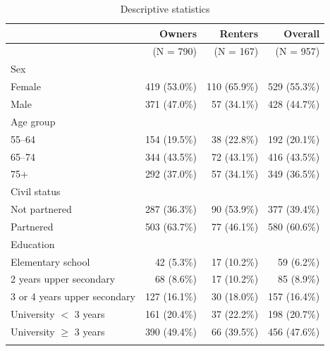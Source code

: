 \begin{table}[H]
\centering
\footnotesize
\begin{threeparttable}
\caption{\label{tab:desc}Descriptive statistics}
\begin{tabular}[t]{lrrr}
\toprule
 & Owners & Renters & Overall \\
\midrule
 & (N = 790) & (N = 167) & (N = 957) \\
\addlinespace[0.8em]

Sex & & & \\
\hspace{1em}Female & 419 (53.0\%) & 110 (65.9\%) & 529 (55.3\%) \\
\hspace{1em}Male & 371 (47.0\%) & 57 (34.1\%) & 428 (44.7\%) \\
\addlinespace[0.6em]

Age group & & & \\
\hspace{1em}55--64 & 154 (19.5\%) & 38 (22.8\%) & 192 (20.1\%) \\
\hspace{1em}65--74 & 344 (43.5\%) & 72 (43.1\%) & 416 (43.5\%) \\
\hspace{1em}75+ & 292 (37.0\%) & 57 (34.1\%) & 349 (36.5\%) \\
\addlinespace[0.6em]

Civil status & & & \\
\hspace{1em}Not partnered & 287 (36.3\%) & 90 (53.9\%) & 377 (39.4\%) \\
\hspace{1em}Partnered & 503 (63.7\%) & 77 (46.1\%) & 580 (60.6\%) \\
\addlinespace[0.6em]

Education & & & \\
\hspace{1em}Elementary school & 42 (5.3\%) & 17 (10.2\%) & 59 (6.2\%) \\
\hspace{1em}2 years upper secondary & 68 (8.6\%) & 17 (10.2\%) & 85 (8.9\%) \\
\hspace{1em}3 or 4 years upper secondary & 127 (16.1\%) & 30 (18.0\%) & 157 (16.4\%) \\
\hspace{1em}University $<$ 3 years & 161 (20.4\%) & 37 (22.2\%) & 198 (20.7\%) \\
\hspace{1em}University $\geq$ 3 years & 390 (49.4\%) & 66 (39.5\%) & 456 (47.6\%) \\
\addlinespace[0.6em]


\end{tabular}
\end{threeparttable}
\end{table}
